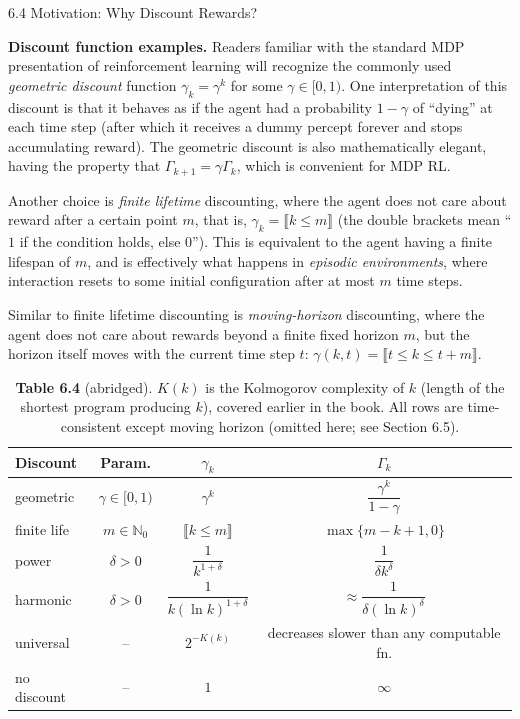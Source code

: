 \documentclass[aspectratio=169,10pt]{beamer}
\begin{document}
\begin{frame}[allowframebreaks]{6.4 Motivation: Why Discount Rewards?}
\framebreak

\textbf{Discount function examples.} Readers familiar with the standard
MDP presentation of reinforcement learning will recognize the commonly
used \emph{geometric discount} function $\gamma_k = \gamma^k$ for some
$\gamma \in [0,1)$. One interpretation of this discount is that it behaves
as if the agent had a probability $1-\gamma$ of ``dying'' at each time step
(after which it receives a dummy percept forever and stops accumulating
reward). The geometric discount is also mathematically elegant, having the
property that $\Gamma_{k+1} = \gamma \Gamma_k$, which is convenient for MDP
RL.

\vspace{0.2cm}
Another choice is \emph{finite lifetime} discounting, where the agent does
not care about reward after a certain point $m$, that is,
$\gamma_k = \llbracket k \le m \rrbracket$ (the double brackets mean ``$1$
if the condition holds, else $0$''). This is equivalent to the agent having
a finite lifespan of $m$, and is effectively what happens in \emph{episodic
environments}, where interaction resets to some initial configuration after
at most $m$ time steps.

\vspace{0.2cm}
Similar to finite lifetime discounting is \emph{moving-horizon}
discounting, where the agent does not care about rewards beyond a finite
fixed horizon $m$, but the horizon itself moves with the current time step
$t$: $\gamma(k,t) = \llbracket t \le k \le t+m \rrbracket$.

\framebreak

\begin{table}[]
\centering
\scriptsize
\begin{tabular}{lccc}
\toprule
Discount & Param. & $\gamma_k$ & $\Gamma_k$ \\
\midrule
geometric & $\gamma\in[0,1)$ & $\gamma^k$ & $\dfrac{\gamma^k}{1-\gamma}$ \\[4pt]
finite life & $m\in\mathbb{N}_0$ & $\llbracket k\le m\rrbracket$ & $\max\{m-k+1,0\}$ \\[4pt]
power & $\delta>0$ & $\dfrac{1}{k^{1+\delta}}$ & $\dfrac{1}{\delta k^\delta}$ \\[4pt]
harmonic & $\delta>0$ & $\dfrac{1}{k(\ln k)^{1+\delta}}$ & $\approx \dfrac{1}{\delta(\ln k)^\delta}$ \\[4pt]
universal & -- & $2^{-K(k)}$ & decreases slower than any computable fn.\\[4pt]
no discount & -- & $1$ & $\infty$ \\
\bottomrule
\end{tabular}
\caption*{\scriptsize \textbf{Table 6.4} (abridged). $K(k)$ is the Kolmogorov
complexity of $k$ (length of the shortest program producing $k$), covered
earlier in the book. All rows are time-consistent except moving horizon
(omitted here; see Section 6.5).}
\end{table}


\end{frame}
\end{document}

